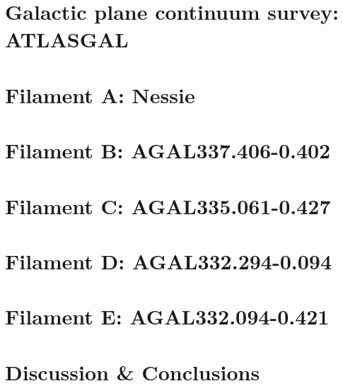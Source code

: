 \documentclass[phd, titlesmallcaps, copyrightpage]{mqthesis}
\numberwithin{equation}{chapter}
\begin{document}
\chapter{Galactic plane continuum survey: ATLASGAL}\label{sec:atlasgal}





\chapter{Filament A: Nessie}


\chapter{Filament B: AGAL337.406-0.402}


\chapter{Filament C: AGAL335.061-0.427}


\chapter{Filament D: AGAL332.294-0.094}


\chapter{Filament E: AGAL332.094-0.421}


%


\chapter{Discussion \& Conclusions}




%
%

\end{document}
